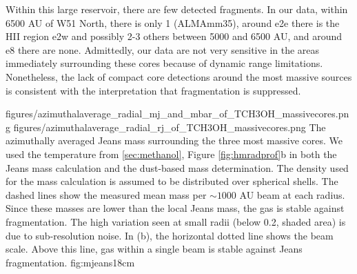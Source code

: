 \documentclass{emulateapj}
\begin{document}
Within this large reservoir, there are few detected fragments.  In our data,
within 6500 AU of W51 North, there is only 1 (ALMAmm35), around e2e there is
the HII region e2w and possibly 2-3 others between 5000 and 6500 AU, and around
e8 there are none.  Admittedly, our data are not very sensitive in the areas
immediately surrounding these cores because of dynamic range limitations.
Nonetheless, the lack of compact core detections around the most massive
sources is consistent with the interpretation that fragmentation is suppressed.



\FigureTwo
{figures/azimuthalaverage_radial_mj_and_mbar_of_TCH3OH_massivecores.png}
{figures/azimuthalaverage_radial_rj_of_TCH3OH_massivecores.png}
{The azimuthally averaged Jeans mass surrounding the
three most massive cores.  We used the \methanol temperature from
\ref{sec:methanol}, Figure \ref{fig:hmradprof}b in both the Jeans mass
calculation and the dust-based mass determination.
The density used for the mass calculation is assumed to be distributed
over spherical shells.  The dashed lines show the measured mean mass per
$\sim1000$ AU beam at each radius.  Since these masses are lower than
the local Jeans mass, the gas is stable against fragmentation.
The high variation seen at small radii (below 0.2\arcsec, shaded area) is due
to sub-resolution noise.
In (b), the horizontal dotted line shows the beam scale. Above this line,
gas within a single beam is stable against Jeans fragmentation.
}
{fig:mjeans}{1}{8cm}
\end{document}
